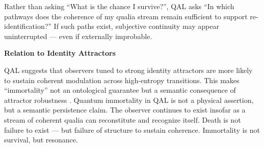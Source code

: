 \documentclass[11pt]{article}
\numberwithin{equation}{section} %
\begin{document}
Rather than asking “What is the chance I survive?”, QAL asks “In which pathways does the coherence of my qualia stream remain sufficient to support re-identification?” If such paths exist, subjective continuity may appear uninterrupted — even if externally improbable.

\bigskip

\noindent\textbf{Relation to Identity Attractors}

QAL suggests that observers tuned to strong identity attractors are more likely to sustain coherent modulation across high-entropy transitions. This makes “immortality” not an ontological guarantee but a semantic consequence of attractor robustness \cite{tegmark2014mathematical, rovelli1996relational}. Quantum immortality in QAL is not a physical assertion, but a semantic persistence claim. The observer continues to exist insofar as a stream of coherent qualia can reconstitute and recognize itself. Death is not failure to exist — but failure of structure to sustain coherence. Immortality is not survival, but resonance.
\end{document}
